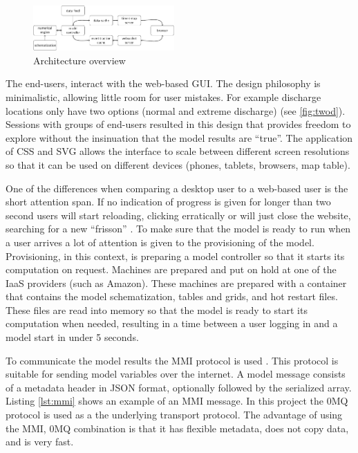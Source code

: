 \documentclass[a4paper]{article}
\begin{document}
\begin{figure}
  \centering
  \vspace{-20pt}
  \includegraphics[width=0.48\textwidth]{arch}
  \caption{Architecture overview}
  \label{fig:arch}
\end{figure}

The end-users, interact with the web-based \ac{GUI}. The design philosophy is minimalistic, allowing little room for user mistakes. For example discharge locations only have two options (normal and extreme discharge) (see \autoref{fig:twod}). Sessions with groups of end-users resulted in this design that provides freedom to explore without the insinuation that the model results are ``true''. The application of \ac{CSS} and \ac{SVG} allows the interface to scale between different screen resolutions so that it can be used on different devices (phones, tablets, browsers, map table).

One of the differences when comparing a desktop user to a web-based user is the short attention span. If no indication of progress is given for longer than two second users will start reloading, clicking erratically or will just close the website, searching for a new ``frisson'' \citep{Carr2011}. To make sure that the model is ready to run when a user arrives a lot of attention is given to the provisioning of the model. Provisioning, in this context, is preparing a model controller so that it starts its computation on request. Machines are prepared and put on hold at one of the \ac{IaaS} providers (such as Amazon). These machines are prepared with a container that contains the model schematization, tables and grids, and hot restart files. These files are read into memory so that the model is ready to start its computation when needed, resulting in a time between a user logging in and a model start in under 5 seconds.

To communicate the model results the \ac{MMI} protocol is used \citep{Baart2014a}. This protocol is suitable for sending model variables over the internet. A model message consists of a metadata header in \ac{JSON} format, optionally followed by the serialized array. Listing \ref{lst:mmi} shows an example of an \ac{MMI} message. In this project the \ac{0MQ} protocol is used as a the underlying transport protocol. The advantage of using the \ac{MMI}, \ac{0MQ} combination is that it has flexible metadata, does not copy data, and is very fast.
\end{document}
